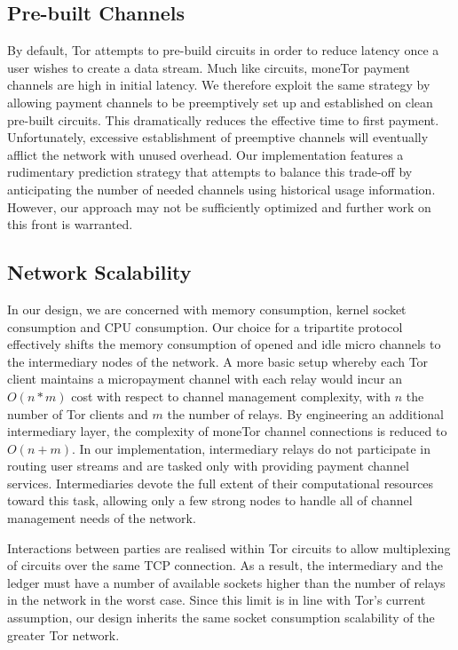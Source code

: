 \subsection{Pre-built Channels}
By default, Tor attempts to pre-build circuits in order to reduce latency once a
user wishes to create a data stream. Much like circuits, moneTor payment
channels are high in initial latency. We therefore exploit the same strategy by
allowing payment channels to be preemptively set up and established on clean
pre-built circuits. This dramatically reduces the effective time to first
payment. Unfortunately, excessive establishment of preemptive channels will
eventually afflict the network with unused overhead. Our implementation features
a rudimentary prediction strategy that attempts to balance this trade-off by
anticipating the number of needed channels using historical usage
information. However, our approach may not be sufficiently optimized and further
work on this front is warranted.

\subsection{Network Scalability}
\label{subsub:scalability}

In our design, we are concerned with memory consumption, kernel socket
consumption and CPU consumption. Our choice for a tripartite protocol
effectively shifts the memory consumption of opened and idle micro
channels to the intermediary nodes of the network. A more basic setup
whereby each Tor client maintains a micropayment channel with each
relay would incur an $O(n*m)$ cost with
respect to channel management complexity, with $n$ the number of Tor clients and $m$ the number of relays. By engineering an additional
intermediary layer, the complexity of moneTor channel connections is
reduced to $O(n+m)$. In our implementation, intermediary relays do not
participate in routing user streams and are tasked only with providing
payment channel services. Intermediaries devote the full extent of
their computational resources toward this task, allowing only a few
strong nodes to handle all of channel management needs of the network.

Interactions between parties are realised within Tor circuits to allow
multiplexing of circuits over the same TCP connection. As a result, the
intermediary and the ledger must have a number of available sockets higher than
the number of relays in the network in the worst case. Since this limit is in
line with Tor's current assumption, our design inherits the same socket
consumption scalability of the greater Tor network.

